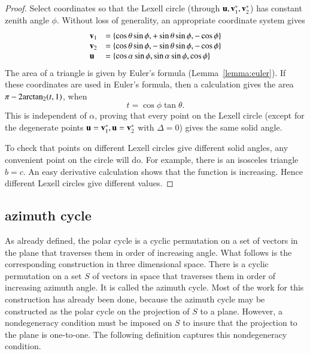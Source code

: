 \begin{proof}  Select coordinates so that the Lexell circle (through ${\mathbf u},{\mathbf v}^*_1,{\mathbf v}^*_2$) has constant zenith angle $\phi$.  Without loss of generality,  an appropriate coordinate system gives 
%
%
$$
\begin{array}{lll}
{\mathbf v}_1 &= \{\cos\theta\sin\phi,+\sin\theta\sin\phi,-\cos\phi\}\\
{\mathbf v}_2 &= \{\cos\theta\sin\phi,-\sin\theta\sin\phi,-\cos\phi\}\\
{\mathbf u} &= \{\cos\alpha\sin\phi,\sin\alpha\sin\phi,\cos\phi\}\\
\end{array}
$$
The area of a triangle is given by Euler's formula (Lemma~\ref{lemma:euler}).  If these coordinates are used in Euler's formula,
then a calculation gives the area $\pi-2{\operatorname{arctan_2}}(t,1)$, when
$$
t=\cos\phi \tan\theta.
$$
This is independent of $\alpha$, proving that every point on the Lexell circle (except for the degenerate points ${\mathbf u}= {\mathbf v}^*_1,{\mathbf u}={\mathbf v}^*_2$ with $\Delta=0$) gives the same solid angle.
%

To check that points on different Lexell circles give different solid angles,  any convenient point on the circle will do.  For example, there is an isosceles triangle $b=c$.  An easy derivative calculation shows that the function is increasing.  Hence different Lexell circles give different values.
\end{proof}
%


\subsection{azimuth cycle}

As already defined, the polar cycle is a cyclic permutation on a set
of vectors in the plane that traverses them in order of increasing
angle.  What follows is the corresponding construction in three dimensional
space.  There is  a cyclic permutation on a set $S$ of vectors in space
that traverses them in order of increasing azimuth angle.  It is called 
the azimuth cycle.  Most of the work for this construction has already been done, because the azimuth cycle may be constructed as the polar cycle on the projection of $S$ to a plane.  However, 
a nondegeneracy condition must be imposed on $S$ to insure that
the projection to the plane is one-to-one.  The following
definition captures this nondegeneracy condition.
%
%
%
%


